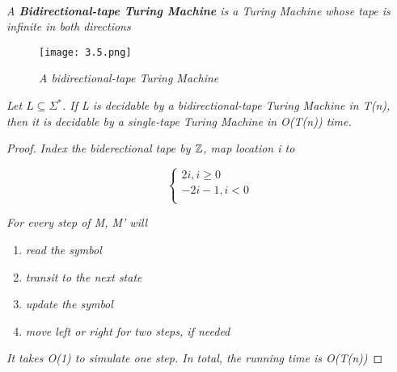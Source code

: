 \documentclass{article}
\begin{document}
\textit{\\A \textbf{Bidirectional-tape Turing Machine} is a Turing Machine whose tape is infinite in both directions}

\begin{figure}[H]
    \begin{center}
        \texttt{[image: 3.5.png]}
    \end{center}

    \caption{\textit{A bidirectional-tape Turing Machine}}
\end{figure}

\begin{lemma}
    \textit{Let $L\subseteq \Sigma^*$. If L is decidable by a bidirectional-tape Turing Machine in T(n), then it is decidable by a single-tape Turing Machine in O(T(n)) time.}
    \begin{proof}
        \textit{Index the biderectional tape by $\mathbb{Z}$, map location i to}

        \[  
            \begin{cases}
                2i , i\geq0 \\
                -2i - 1 , i < 0 \\
            \end{cases}
        \]

        \newpage

        \textit{For every step of M, M' will}

        \begin{enumerate}
            \item \textit{read the symbol}
            \item \textit{transit to the next state}
            \item \textit{update the symbol}
            \item \textit{move left or right for two steps, if needed}
        \end{enumerate}

        \textit{It takes O(1) to simulate one step. In total, the running time is O(T(n))}
    \end{proof}
\end{lemma}
\end{document}
